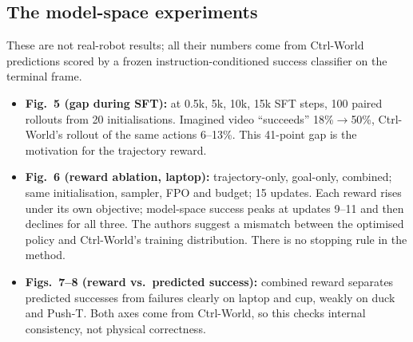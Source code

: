 \documentclass[11pt,a4paper]{article}
\theoremstyle{remark}
\begin{document}
\subsection{The model-space experiments}
These are not real-robot results; all their numbers come from Ctrl-World predictions scored by a frozen instruction-conditioned success classifier on the terminal frame.
\begin{itemize}
\item \textbf{Fig.~5 (gap during SFT):} at 0.5k, 5k, 10k, 15k SFT steps, 100 paired rollouts from 20 initialisations. Imagined video ``succeeds'' 18\%$\to$50\%, Ctrl-World's rollout of the same actions 6--13\%. This 41-point gap is the motivation for the trajectory reward.
\item \textbf{Fig.~6 (reward ablation, laptop):} trajectory-only, goal-only, combined; same initialisation, sampler, FPO and budget; 15 updates. Each reward rises under its own objective; model-space success peaks at updates 9--11 and then declines for all three. The authors suggest a mismatch between the optimised policy and Ctrl-World's training distribution. There is no stopping rule in the method.
\item \textbf{Figs.~7--8 (reward vs.\ predicted success):} combined reward separates predicted successes from failures clearly on laptop and cup, weakly on duck and Push-T. Both axes come from Ctrl-World, so this checks internal consistency, not physical correctness.
\end{itemize}
\end{document}
